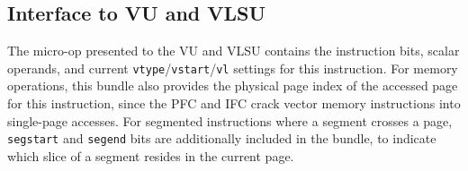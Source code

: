 \subsection{Interface to VU and VLSU}

The micro-op presented to the VU and VLSU contains the instruction bits, scalar operands, and current \texttt{vtype}/\texttt{vstart}/\texttt{vl} settings for this instruction.
For memory operations, this bundle also provides the physical page index of the accessed page for this instruction, since the PFC and IFC crack vector memory instructions into single-page accesses.
For segmented instructions where a segment crosses a page, \texttt{segstart} and \texttt{segend} bits are additionally included in the bundle, to indicate which slice of a segment resides in the current page.

